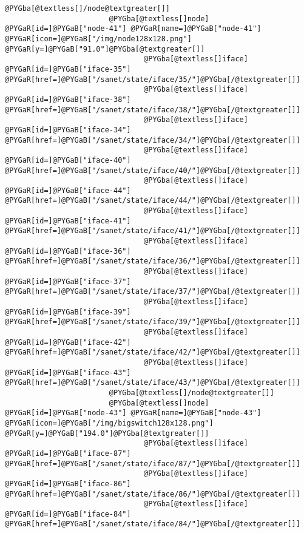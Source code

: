 \documentclass[a4wide,10pt,italian]{manual}
\begin{document}
\begin{Verbatim}[commandchars=@\[\]]
                        @PYGba[@textless[]/node@textgreater[]]
                        @PYGba[@textless[]node] @PYGaR[id=]@PYGaB["node-41"] @PYGaR[name=]@PYGaB["node-41"] @PYGaR[icon=]@PYGaB["/img/node128x128.png"] @PYGaR[y=]@PYGaB["91.0"]@PYGba[@textgreater[]]
                                @PYGba[@textless[]iface] @PYGaR[id=]@PYGaB["iface-35"] @PYGaR[href=]@PYGaB["/sanet/state/iface/35/"]@PYGba[/@textgreater[]]
                                @PYGba[@textless[]iface] @PYGaR[id=]@PYGaB["iface-38"] @PYGaR[href=]@PYGaB["/sanet/state/iface/38/"]@PYGba[/@textgreater[]]
                                @PYGba[@textless[]iface] @PYGaR[id=]@PYGaB["iface-34"] @PYGaR[href=]@PYGaB["/sanet/state/iface/34/"]@PYGba[/@textgreater[]]
                                @PYGba[@textless[]iface] @PYGaR[id=]@PYGaB["iface-40"] @PYGaR[href=]@PYGaB["/sanet/state/iface/40/"]@PYGba[/@textgreater[]]
                                @PYGba[@textless[]iface] @PYGaR[id=]@PYGaB["iface-44"] @PYGaR[href=]@PYGaB["/sanet/state/iface/44/"]@PYGba[/@textgreater[]]
                                @PYGba[@textless[]iface] @PYGaR[id=]@PYGaB["iface-41"] @PYGaR[href=]@PYGaB["/sanet/state/iface/41/"]@PYGba[/@textgreater[]]
                                @PYGba[@textless[]iface] @PYGaR[id=]@PYGaB["iface-36"] @PYGaR[href=]@PYGaB["/sanet/state/iface/36/"]@PYGba[/@textgreater[]]
                                @PYGba[@textless[]iface] @PYGaR[id=]@PYGaB["iface-37"] @PYGaR[href=]@PYGaB["/sanet/state/iface/37/"]@PYGba[/@textgreater[]]
                                @PYGba[@textless[]iface] @PYGaR[id=]@PYGaB["iface-39"] @PYGaR[href=]@PYGaB["/sanet/state/iface/39/"]@PYGba[/@textgreater[]]
                                @PYGba[@textless[]iface] @PYGaR[id=]@PYGaB["iface-42"] @PYGaR[href=]@PYGaB["/sanet/state/iface/42/"]@PYGba[/@textgreater[]]
                                @PYGba[@textless[]iface] @PYGaR[id=]@PYGaB["iface-43"] @PYGaR[href=]@PYGaB["/sanet/state/iface/43/"]@PYGba[/@textgreater[]]
                        @PYGba[@textless[]/node@textgreater[]]
                        @PYGba[@textless[]node] @PYGaR[id=]@PYGaB["node-43"] @PYGaR[name=]@PYGaB["node-43"] @PYGaR[icon=]@PYGaB["/img/bigswitch128x128.png"] @PYGaR[y=]@PYGaB["194.0"]@PYGba[@textgreater[]]
                                @PYGba[@textless[]iface] @PYGaR[id=]@PYGaB["iface-87"] @PYGaR[href=]@PYGaB["/sanet/state/iface/87/"]@PYGba[/@textgreater[]]
                                @PYGba[@textless[]iface] @PYGaR[id=]@PYGaB["iface-86"] @PYGaR[href=]@PYGaB["/sanet/state/iface/86/"]@PYGba[/@textgreater[]]
                                @PYGba[@textless[]iface] @PYGaR[id=]@PYGaB["iface-84"] @PYGaR[href=]@PYGaB["/sanet/state/iface/84/"]@PYGba[/@textgreater[]]

\end{Verbatim}
\end{document}
